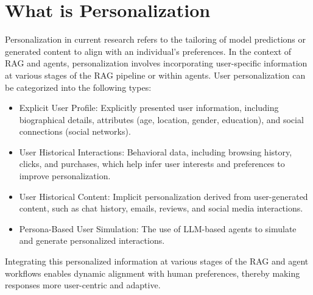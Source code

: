 \section{What is Personalization} \label{sec:what}
Personalization in current research refers to the tailoring of model predictions or generated content to align with an individual's preferences. In the context of RAG and agents, personalization involves incorporating user-specific information at various stages of the RAG pipeline or within agents. User personalization can be categorized into the following types:

\begin{itemize}[leftmargin=*] 
\item Explicit User Profile: Explicitly presented user information, including biographical details, attributes (\eg age, location, gender, education), and social connections (\eg social networks).
\item User Historical Interactions: Behavioral data, including browsing history, clicks, and purchases, which help infer user interests and preferences to improve personalization. 
\item User Historical Content: Implicit personalization derived from user-generated content, such as chat history, emails, reviews, and social media interactions. 
\item Persona-Based User Simulation: The use of LLM-based agents to simulate and generate personalized interactions.
\end{itemize}

Integrating this personalized information at various stages of the RAG and agent workflows enables dynamic alignment with human preferences, thereby making responses more user-centric and adaptive.